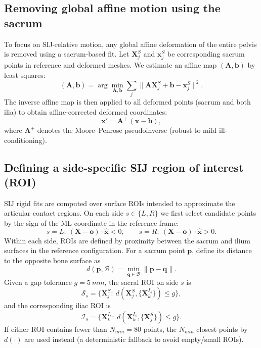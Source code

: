 \subsection{Removing global affine motion using the sacrum}
To focus on SIJ-relative motion, any global affine deformation of the entire pelvis is removed using a sacrum-based fit.
Let $\mathbf{X}^{S}_j$ and $\mathbf{x}^{S}_j$ be corresponding sacrum points in reference and deformed meshes.
We estimate an affine map $(\mathbf{A},\mathbf{b})$ by least squares:
\begin{equation}
(\mathbf{A},\mathbf{b})
=
\arg\min_{\mathbf{A},\mathbf{b}}
\sum_j \big\| \mathbf{A}\mathbf{X}^{S}_j+\mathbf{b}-\mathbf{x}^{S}_j \big\|^2.
\end{equation}
The inverse affine map is then applied to all deformed points (sacrum and both ilia) to obtain affine-corrected deformed coordinates:
\begin{equation}
\mathbf{x}'=\mathbf{A}^{+}\,(\mathbf{x}-\mathbf{b}),
\end{equation}
where $\mathbf{A}^{+}$ denotes the Moore--Penrose pseudoinverse (robust to mild ill-conditioning).

\subsection{Defining a side-specific SIJ region of interest (ROI)}
SIJ rigid fits are computed over surface ROIs intended to approximate the articular contact regions.
On each side $s\in\{L,R\}$ we first select candidate points by the sign of the ML coordinate in the reference frame:
\begin{equation}
s=L:\ (\mathbf{X}-\mathbf{o})\cdot\hat{\mathbf{x}}<0,
\qquad
s=R:\ (\mathbf{X}-\mathbf{o})\cdot\hat{\mathbf{x}}>0.
\end{equation}
Within each side, ROIs are defined by proximity between the sacrum and ilium surfaces in the reference configuration.
For a sacrum point $\mathbf{p}$, define its distance to the opposite bone surface as
\begin{equation}
d(\mathbf{p},\mathcal{B})=\min_{\mathbf{q}\in\mathcal{B}}\|\mathbf{p}-\mathbf{q}\|.
\end{equation}
Given a gap tolerance $g=\SI{5}{mm}$, the sacral ROI on side $s$ is
\begin{equation}
\mathcal{S}_s=\{\mathbf{X}^{S}_j:\ d(\mathbf{X}^{S}_j,\{\mathbf{X}^{I_s}_k\})\le g\},
\end{equation}
and the corresponding iliac ROI is
\begin{equation}
\mathcal{I}_s=\{\mathbf{X}^{I_s}_k:\ d(\mathbf{X}^{I_s}_k,\{\mathbf{X}^{S}_j\})\le g\}.
\end{equation}
If either ROI contains fewer than $N_{min}=80$ points, the $N_{min}$ closest points by $d(\cdot)$ are used instead (a deterministic fallback to avoid empty/small ROIs).

